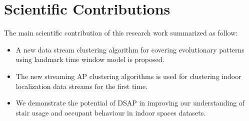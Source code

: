 



 






\section{Scientific Contributions}


The main scientific contribution of this research work summarized as follow:

\begin{itemize}
    
    \item A new data stream clustering algorithm for covering evolutionary patterns using landmark time window model is proposed. 
    \item  The new streaming AP clustering algorithms is used for clustering indoor localization data streams for the first time.
    
    \item We demonstrate the potential of DSAP in improving our understanding of stair usage and occupant behaviour in indoor spaces datasets.
\end{itemize}



